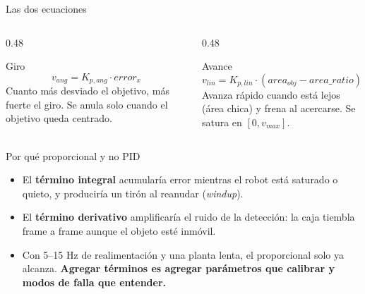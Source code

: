 \documentclass[aspectratio=169,10pt]{beamer}
\begin{document}
\begin{frame}{Las dos ecuaciones}
  \begin{columns}[T,onlytextwidth]
    \begin{column}{0.48\textwidth}
      \begin{block}{Giro}
        \[ v_{ang} = K_{p,ang}\cdot error_x \]
        \small Cuanto más desviado el objetivo, más fuerte el giro. Se anula solo
        cuando el objetivo queda centrado.
      \end{block}
    \end{column}
    \begin{column}{0.48\textwidth}
      \begin{block}{Avance}
        \[ v_{lin} = K_{p,lin}\cdot (area_{obj} - area\_ratio) \]
        \small Avanza rápido cuando está lejos (área chica) y frena al acercarse.
        Se satura en $[0, v_{max}]$.
      \end{block}
    \end{column}
  \end{columns}

  \vspace{0.7em}
  \begin{block}{Por qué proporcional y no PID}
    \small
    \begin{itemize}
      \item El \textbf{término integral} acumularía error mientras el robot está
            saturado o quieto, y produciría un tirón al reanudar (\emph{windup}).
      \item El \textbf{término derivativo} amplificaría el ruido de la detección:
            la caja tiembla frame a frame aunque el objeto esté inmóvil.
      \item Con 5--15 Hz de realimentación y una planta lenta, el proporcional
            solo ya alcanza. \textbf{Agregar términos es agregar parámetros que
            calibrar y modos de falla que entender.}
    \end{itemize}
  \end{block}
\end{frame}
\end{document}
